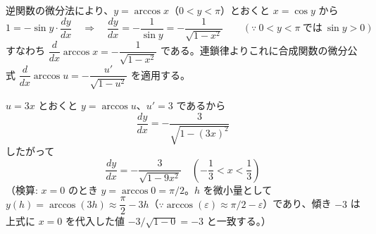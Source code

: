 
逆関数の微分法により、$y=\arccos x$（$0<y<\pi$）とおくと $x=\cos y$ から
\[
1 = -\sin y \cdot \frac{dy}{dx}
\quad\Longrightarrow\quad
\frac{dy}{dx} = -\frac{1}{\sin y} = -\frac{1}{\sqrt{1-x^{2}}}
\qquad(\because\ 0<y<\pi\ \text{では}\ \sin y>0)
\]
すなわち $\dfrac{d}{dx}\arccos x = -\dfrac{1}{\sqrt{1-x^{2}}}$ である。連鎖律よりこれに合成関数の微分公式 $\dfrac{d}{dx}\arccos u = -\dfrac{u'}{\sqrt{1-u^{2}}}$ を適用する。

$u = 3x$ とおくと $y = \arccos u$、$u' = 3$ であるから
\[
\frac{dy}{dx} = -\frac{3}{\sqrt{1-(3x)^{2}}}
\]
したがって
\[
\boxed{\; \frac{dy}{dx} = -\frac{3}{\sqrt{1-9x^{2}}} \quad \left(-\frac{1}{3} < x < \frac{1}{3}\right) \;}
\]
（検算: $x=0$ のとき $y=\arccos 0 = \pi/2$。$h$ を微小量として $y(h) = \arccos(3h) \approx \dfrac{\pi}{2} - 3h$（$\because \arccos(\varepsilon)\approx \pi/2-\varepsilon$）であり、傾き $-3$ は上式に $x=0$ を代入した値 $-3/\sqrt{1-0}=-3$ と一致する。）
